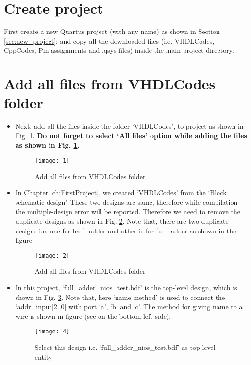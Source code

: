 \section{Create project} \label{app:CreateProject}
First create a new Quartus project (with any name) as shown in Section \ref{sec:new_project}; and copy all the downloaded files (i.e. VHDLCodes, CppCodes, Pin-assignments  and .qsys files) inside the main project directory. 

\section{Add all files from VHDLCodes folder}

\begin{itemize}
	\item Next, add all the files inside the folder `VHDLCodes', to project as shown in Fig. \ref{fig:add_all_VHDLCodes}. \textbf{Do not forget to select `All files' option while adding the files as shown in Fig. \ref{fig:add_all_VHDLCodes}. } 
	
	\begin{figure}[!h]
		\centering
		\texttt{[image: 1]}
		\caption{Add all files from VHDLCodes folder}
		\label{fig:add_all_VHDLCodes}
	\end{figure}
		
	\item In Chapter \ref{ch:FirstProject}, we created  `VHDLCodes' from the `Block schematic design'. These two designs are same, therefore while compilation the multiple-design error will be reported. Therefore we need to remove the duplicate designs as shown in Fig. \ref{fig:remove_duplicate}.  Note that, there are two duplicate designs i.e. one for half\_adder and other is for full\_adder as shown in the figure. 
	\begin{figure}[!h]
		\centering
		\texttt{[image: 2]}
		\caption{Add all files from VHDLCodes folder}
		\label{fig:remove_duplicate}
	\end{figure}

	
	\item In this project, `full\_adder\_nios\_test.bdf' is the top-level design, which is shown in Fig. \ref{fig:full_adder_top_d}. Note that, here `name method' is used to connect the `addr\_input[2..0] with port `a', `b' and `c'. The method for giving name to a wire is shown in figure (see on the bottom-left side). 
	
	\begin{figure}[!h]
		\centering
		\texttt{[image: 4]}
		\caption{Select this design i.e. `full\_adder\_nios\_test.bdf' as top level entity}
		\label{fig:full_adder_top_d}
	\end{figure}
	

\end{itemize}
